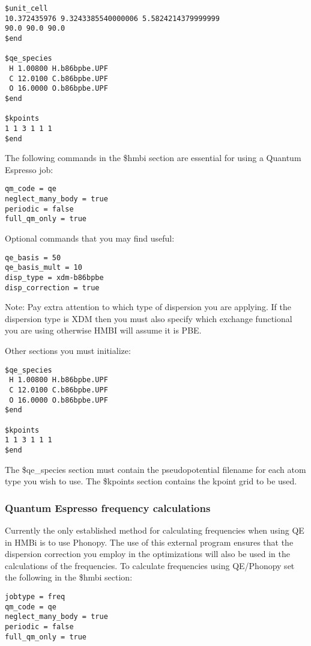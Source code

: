 \documentclass[11pt,letterpaper]{article}
\begin{document}
\begin{spacing}{1.0}
\begin{verbatim}
$unit_cell
10.372435976 9.3243385540000006 5.5824214379999999
90.0 90.0 90.0
$end

$qe_species
 H 1.00800 H.b86bpbe.UPF
 C 12.0100 C.b86bpbe.UPF
 O 16.0000 O.b86bpbe.UPF
$end

$kpoints
1 1 3 1 1 1
$end
\end{verbatim}


The following commands in the \$hmbi section are essential for using a Quantum Espresso job:

\begin{verbatim}
qm_code = qe
neglect_many_body = true
periodic = false
full_qm_only = true
\end{verbatim}

Optional commands that you may find useful:

\begin{verbatim}
qe_basis = 50
qe_basis_mult = 10
disp_type = xdm-b86bpbe
disp_correction = true
\end{verbatim}

Note: Pay extra attention to which type of dispersion you are applying. If the dispersion type is XDM then you must also specify which exchange functional you are using otherwise HMBI will assume it is PBE.

Other sections you must initialize:

\begin{verbatim}
$qe_species
 H 1.00800 H.b86bpbe.UPF
 C 12.0100 C.b86bpbe.UPF
 O 16.0000 O.b86bpbe.UPF
$end

$kpoints
1 1 3 1 1 1
$end
\end{verbatim}

The \$qe\_species section must contain the pseudopotential filename for each atom type you wish to use. The \$kpoints section contains the kpoint grid to be used.


\subsubsection{Quantum Espresso frequency calculations}
Currently the only established method for calculating frequencies when using QE in HMBi is to use Phonopy. The use of this external program ensures that the dispersion correction you employ in the optimizations will also be used in the calculations of the frequencies. To calculate frequencies using QE/Phonopy set the following in the \$hmbi section: 

\begin{verbatim}
jobtype = freq
qm_code = qe
neglect_many_body = true
periodic = false
full_qm_only = true
\end{verbatim}


\end{spacing}
\end{document}
